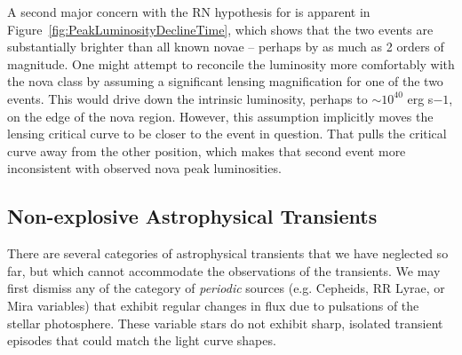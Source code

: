 A second major concern with the RN hypothesis for \spock is apparent
in Figure~\ref{fig:PeakLuminosityDeclineTime}, which shows that the
two \spock events are substantially brighter than all known novae --
perhaps by as much as 2 orders of magnitude.  One might attempt to
reconcile the \spock luminosity more comfortably with the nova class
by assuming a significant lensing magnification for one of the two
events. This would drive down the intrinsic luminosity, perhaps to
$\sim10^{40}$ erg s${-1}$, on the edge of the nova region.  However,
this assumption implicitly moves the lensing critical curve to be
closer to the \spock event in question.  That pulls the critical curve
away from the other \spock position, which makes that second event
{\rm more inconsistent} with observed nova peak luminosities.  



\subsection{Non-explosive Astrophysical Transients}

There are several categories of astrophysical transients that we have
neglected so far, but which cannot accommodate the observations of the
\spock transients.  We may first dismiss any of the category of {\it
  periodic} sources (e.g. Cepheids, RR Lyrae, or Mira variables) that
exhibit regular changes in flux due to pulsations of the stellar
photosphere. These variable stars do not exhibit sharp, isolated
transient episodes that could match the \spock light curve shapes.

